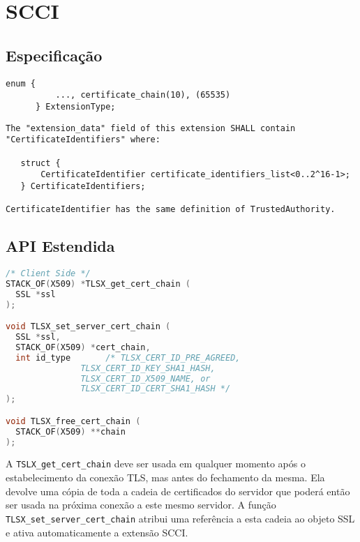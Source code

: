 
\section{\acl{SCCI}}

\subsection{Especificação}

\begin{lstlisting}[caption={Definição (não-oficial) da extensão \acs{SCCI}}]
      enum { 
          ..., certificate_chain(10), (65535) 
      } ExtensionType;
\end{lstlisting}

\begin{lstlisting}[caption={Especificação (não-oficial) da extensão \acs{SCCI}}]
The "extension_data" field of this extension SHALL contain
"CertificateIdentifiers" where: 
  
   struct { 
       CertificateIdentifier certificate_identifiers_list<0..2^16-1>; 
   } CertificateIdentifiers; 
 
CertificateIdentifier has the same definition of TrustedAuthority.
\end{lstlisting}

\subsection{API Estendida}

\begin{lstlisting}[language=C,emph={TLSX_get_cert_chain,TLSX_set_server_cert_chain,TLSX_free_cert_chain},%
		    caption={API Estendida para a extensão \acs{SCCI}}]
/* Client Side */
STACK_OF(X509) *TLSX_get_cert_chain (
  SSL *ssl
);

void TLSX_set_server_cert_chain (
  SSL *ssl,
  STACK_OF(X509) *cert_chain,
  int id_type		/* TLSX_CERT_ID_PRE_AGREED,
			   TLSX_CERT_ID_KEY_SHA1_HASH,
			   TLSX_CERT_ID_X509_NAME, or
			   TLSX_CERT_ID_CERT_SHA1_HASH */
);

void TLSX_free_cert_chain (
  STACK_OF(X509) **chain
);
\end{lstlisting}

A \verb|TSLX_get_cert_chain| deve ser usada em qualquer momento após o 
estabelecimento da conexão TLS, mas antes do fechamento da mesma. Ela 
devolve uma cópia de toda a cadeia de certificados do servidor que
poderá então ser usada na próxima conexão a este 
mesmo servidor. A função \verb|TLSX_set_server_cert_chain| atribui uma referência a 
esta cadeia ao objeto SSL e ativa automaticamente a extensão \acl{SCCI}.

